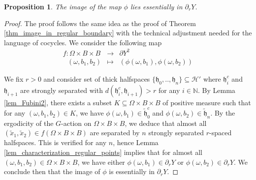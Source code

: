 \documentclass{amsart}
\numberwithin{equation}{section}
\newtheorem{prop}[thm]{Proposition}
\newcommand{\HH}{\mathcal{H}}     %
\newcommand{\hh}{\mathfrak{h}}    %
\newcommand{\NN}{\mathbb{N}}      %
\theoremstyle{definition}
\begin{document}
\begin{prop}
    The image of the map $\phi$ lies essentially in $\partial_r Y$.
\end{prop}
    \begin{proof}
        The proof follows the same idea as the proof of Theorem \ref{thm_image_in_regular_boundary} with the technical adjustment needed for the language of cocycles. We consider the following map 
        \begin{eqnarray*}
            f: \Omega\times B\times B &\rightarrow& \partial Y^2\\
            \ \ \ (\omega,b_1,b_2)&\mapsto& (\phi(\omega,b_1),\phi(\omega,b_2))
        \end{eqnarray*}
        
        We fix $r>0$ and consider set of thick halfspaces $\{\hh_0,..,\hh_n \} \subseteq \HH'$ where $\hh_i^c$ and $\hh_{i+1}$ are strongly separated with $d(\hh_i^c,\hh_{i+1})>r$ for any $i\in\NN$. By Lemma \ref{lem_Fubini2}, there exists a subset $K\subseteq \Omega\times B\times B$ of positive measure such that for any $(\omega,b_1,b_2)\in K$, we have $\phi(\omega,b_1)\in\tilde{\hh}_0^c$ and $\phi(\omega,b_2)\in\tilde{\hh}_n$. By the ergodicity of the $G$-action on $\Omega\times B\times B$, we deduce that almost all $(\tilde{x}_1,\tilde{x}_2)\in f(\Omega\times B\times B)$ are separated by $n$ strongly separated $r$-spaced halfspaces. This is verified for any $n$, hence Lemma \ref{lem_characterization_regular_points} implies that for almost all $(\omega,b_1,b_2)\in \Omega\times B\times B$, we have either $\phi(\omega,b_1)\in\partial_r Y$ or $\phi(\omega,b_2)\in\partial_r Y$. We conclude then that the image of $\phi$ is essentially in $\partial_r Y$.
    \end{proof}
\end{document}
